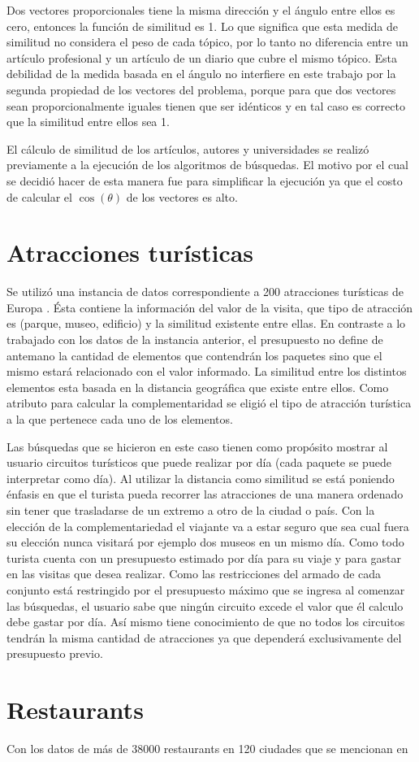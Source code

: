 Dos vectores proporcionales tiene la misma dirección y el ángulo entre ellos es cero, entonces la función de similitud es 1. Lo que significa que esta medida de similitud no considera el peso de cada tópico, por lo tanto no diferencia entre un artículo profesional y un artículo de un diario que cubre el mismo tópico. Esta debilidad de la medida basada en el ángulo no interfiere en este trabajo por la segunda propiedad de los vectores del problema, porque para que dos vectores sean proporcionalmente iguales tienen que ser idénticos y en tal caso es correcto que la similitud entre ellos sea 1.

El cálculo de similitud de los artículos, autores y universidades se realizó previamente a la ejecución de los algoritmos de búsquedas. El motivo por el cual se decidió hacer de esta manera fue para simplificar la ejecución ya que el costo de calcular el $\cos(\theta)$ de los vectores es alto.
\section{Atracciones turísticas}
Se utilizó una instancia de datos correspondiente a 200 atracciones turísticas de Europa \cite{turisticAtraction}. Ésta contiene la información del valor de la visita, que tipo de atracción es (parque, museo, edificio) y la similitud existente entre ellas. En contraste a lo trabajado con los datos de la instancia anterior, el presupuesto no define de antemano la cantidad de elementos que contendrán los paquetes sino que el mismo estará relacionado con el valor informado. La similitud entre los distintos elementos esta basada en la distancia geográfica que existe entre ellos. Como atributo para calcular la complementaridad se eligió el tipo de atracción turística a la que pertenece cada uno de los elementos.

Las búsquedas que se hicieron en este caso tienen como propósito mostrar al usuario circuitos turísticos que puede realizar por día (cada paquete se puede interpretar como día). Al utilizar la distancia como similitud se está poniendo énfasis en que el turista pueda recorrer las atracciones de una manera ordenado sin tener que trasladarse de un extremo a otro de la ciudad o país. Con la elección de la complementariedad el viajante va a estar seguro que sea cual fuera su elección nunca visitará por ejemplo dos museos en un mismo día. Como todo turista cuenta con un presupuesto estimado por día para su viaje y para gastar en las visitas que desea realizar. Como las restricciones del armado de cada conjunto está restringido por el presupuesto máximo que se ingresa al comenzar las búsquedas, el usuario sabe que ningún circuito excede el valor que él calculo debe gastar por día. Así mismo tiene conocimiento de que no todos los circuitos tendrán la misma cantidad de atracciones ya que dependerá exclusivamente del presupuesto previo.
\section{Restaurants}
Con los datos de más de 38000 restaurants en 120 ciudades que se mencionan en \cite{compositeRetrival}
